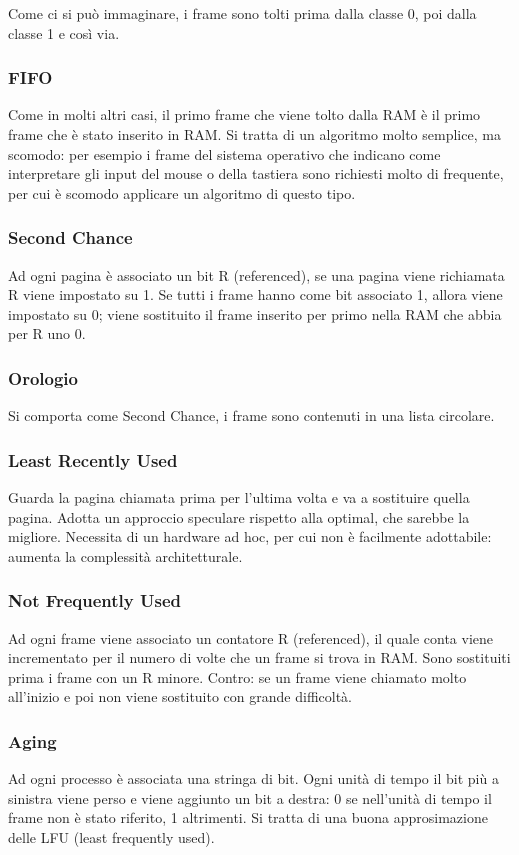 \documentclass{article}
\begin{document}
Come ci si può immaginare, i frame sono tolti prima dalla classe 0, poi dalla classe 1 e così via.

\subsubsection{FIFO}
Come in molti altri casi, il primo frame che viene tolto dalla RAM è il primo frame che è stato inserito in RAM. Si tratta di un algoritmo molto semplice, ma scomodo: per esempio i frame del sistema operativo che indicano come interpretare gli input del mouse o della tastiera sono richiesti molto di frequente, per cui è scomodo applicare un algoritmo di questo tipo.

\subsubsection{Second Chance}
Ad ogni pagina è associato un bit R (referenced), se una pagina viene richiamata R viene impostato su 1. Se tutti i frame hanno come bit associato 1, allora viene impostato su 0; viene sostituito il frame inserito per primo nella RAM che abbia per R uno 0.

\subsubsection{Orologio}
Si comporta come Second Chance, i frame sono contenuti in una lista circolare.

\subsubsection{Least Recently Used}
Guarda la pagina chiamata prima per l'ultima volta e va a sostituire quella pagina. Adotta un approccio speculare rispetto alla optimal, che sarebbe la migliore. Necessita di un hardware ad hoc, per cui non è facilmente adottabile: aumenta la complessità architetturale.

\subsubsection{Not Frequently Used}
Ad ogni frame viene associato un contatore R (referenced), il quale conta viene incrementato per il numero di volte che un frame si trova in RAM. Sono sostituiti prima i frame con un R minore. Contro: se un frame viene chiamato molto all'inizio e poi non viene sostituito con grande difficoltà.

\subsubsection{Aging}
Ad ogni processo è associata una stringa di bit. Ogni unità di tempo il bit più a sinistra viene perso e viene aggiunto un bit a destra: 0 se nell'unità di tempo il frame non è stato riferito, 1 altrimenti. Si tratta di una buona approsimazione delle LFU (least frequently used).
\end{document}
